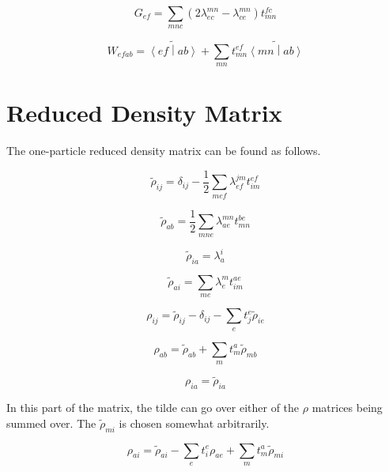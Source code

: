 \documentclass{article}
\begin{document}
\begin{equation}
  G_{ef} = \sum_{mnc}\left(2\lambda_{ec}^{mn} - \lambda_{ce}^{mn}\right)t_{mn}^{fc}
\end{equation}

\begin{equation}
  W_{efab} = \widetilde{\left<ef\middle|ab\right>} + \sum_{mn}t_{mn}^{ef}\widetilde{\left<mn\middle|ab\right>}
\end{equation}

\section{Reduced Density Matrix}

The one-particle reduced density matrix can be found as follows.

\begin{equation}
  \tilde{\rho}_{ij} = \delta_{ij} - \frac{1}{2}\sum_{mef}\lambda_{ef}^{jm}t_{im}^{ef}
\end{equation}

\begin{equation}
  \tilde{\rho}_{ab} = \frac{1}{2}\sum_{mne}\lambda_{ae}^{mn}t_{mn}^{be}
\end{equation}

\begin{equation}
  \tilde{\rho}_{ia} = \lambda_a^i
\end{equation}

\begin{equation}
  \tilde{\rho}_{ai} = \sum_{me}\lambda_e^mt_{im}^{ae}
\end{equation}

\begin{equation}
  \rho_{ij} = \tilde{\rho}_{ij} - \delta_{ij} - \sum_et_j^e\tilde{\rho}_{ie}
\end{equation}

\begin{equation}
  \rho_{ab} = \tilde{\rho}_{ab} + \sum_mt_m^a\tilde{\rho}_{mb}
\end{equation}

\begin{equation}
  \rho_{ia} = \tilde{\rho}_{ia}
\end{equation}

In this part of the matrix, the tilde can go over either of the $\rho$ matrices being summed over. The $\tilde{\rho}_{mi}$ is chosen somewhat arbitrarily.

\begin{equation}
  \rho_{ai} = \tilde{\rho}_{ai} - \sum_{e}t_i^e\rho_{ae} + \sum_mt_m^a\tilde{\rho}_{mi}
\end{equation}
\end{document}
